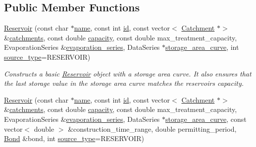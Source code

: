 \subsection*{Public Member Functions}
\begin{DoxyCompactItemize}
\item 
\mbox{\hyperlink{classReservoir_ac9803ae5446e4e9a2631ce66817004cf}{Reservoir}} (const char $\ast$\mbox{\hyperlink{classWaterSource_a846ea74c5b453d014f594d41fee8c765}{name}}, const int \mbox{\hyperlink{classWaterSource_a6eafe5dfefd317877d1244e8a7c6e742}{id}}, const vector$<$ \mbox{\hyperlink{classCatchment}{Catchment}} $\ast$$>$ \&\mbox{\hyperlink{classWaterSource_a8c18c34f23f8a06685c1d12f462ed830}{catchments}}, const double \mbox{\hyperlink{classWaterSource_a2ec257b415b248214a8bce7fc5267723}{capacity}}, const double max\+\_\+treatment\+\_\+capacity, Evaporation\+Series \&\mbox{\hyperlink{classReservoir_a2d2d9b302c13703309bb798d24136810}{evaporation\+\_\+series}}, Data\+Series $\ast$\mbox{\hyperlink{classReservoir_a46bd5b750963dfa9a57b247fd77ab8ff}{storage\+\_\+area\+\_\+curve}}, int \mbox{\hyperlink{classWaterSource_afdd12c29fc74ea21dff1f1be9b8c2b7b}{source\+\_\+type}}=R\+E\+S\+E\+R\+V\+O\+IR)
\begin{DoxyCompactList}\small\item\em Constructs a basic \mbox{\hyperlink{classReservoir}{Reservoir}} object with a storage area curve. It also ensures that the last storage value in the storage area curve matches the reservoir\textquotesingle{}s capacity. \end{DoxyCompactList}\item 
\mbox{\hyperlink{classReservoir_a2e324b75aacc65d90b214ff7f62dfa89}{Reservoir}} (const char $\ast$\mbox{\hyperlink{classWaterSource_a846ea74c5b453d014f594d41fee8c765}{name}}, const int \mbox{\hyperlink{classWaterSource_a6eafe5dfefd317877d1244e8a7c6e742}{id}}, const vector$<$ \mbox{\hyperlink{classCatchment}{Catchment}} $\ast$$>$ \&\mbox{\hyperlink{classWaterSource_a8c18c34f23f8a06685c1d12f462ed830}{catchments}}, const double \mbox{\hyperlink{classWaterSource_a2ec257b415b248214a8bce7fc5267723}{capacity}}, const double max\+\_\+treatment\+\_\+capacity, Evaporation\+Series \&\mbox{\hyperlink{classReservoir_a2d2d9b302c13703309bb798d24136810}{evaporation\+\_\+series}}, Data\+Series $\ast$\mbox{\hyperlink{classReservoir_a46bd5b750963dfa9a57b247fd77ab8ff}{storage\+\_\+area\+\_\+curve}}, const vector$<$ double $>$ \&construction\+\_\+time\+\_\+range, double permitting\+\_\+period, \mbox{\hyperlink{classBond}{Bond}} \&bond, int \mbox{\hyperlink{classWaterSource_afdd12c29fc74ea21dff1f1be9b8c2b7b}{source\+\_\+type}}=R\+E\+S\+E\+R\+V\+O\+IR)

\end{DoxyCompactItemize}
